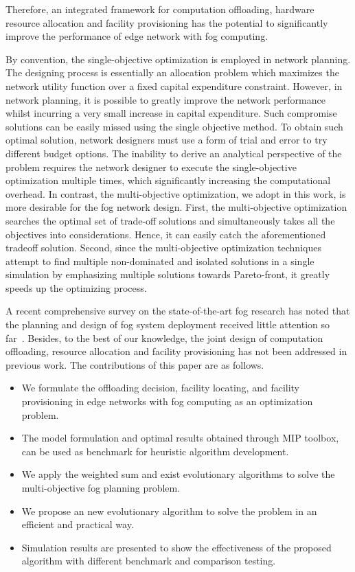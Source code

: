 \documentclass[10pt,journal,compsoc]{IEEEtran}
\begin{document}
Therefore, an integrated framework for computation offloading, hardware resource allocation and facility provisioning has the potential to significantly improve the performance of edge network with fog computing.

By convention, the single-objective optimization is employed in network planning. The designing process is essentially an allocation problem which maximizes the network utility function over a fixed capital expenditure constraint. 
However, in network planning, it is possible to greatly improve the network performance whilst incurring a very small increase in capital expenditure. Such compromise solutions can be easily missed using the single objective method. To obtain such optimal solution, network designers must use a form of trial and error to try different budget options. The inability to derive an analytical perspective of the problem requires the network designer to execute the single-objective optimization multiple times, which significantly increasing the computational overhead. 
In contrast, the multi-objective optimization, we adopt in this work, is more desirable for the fog network design. First, the multi-objective optimization searches the optimal set of trade-off solutions and simultaneously takes all the objectives into considerations. Hence, it can easily catch the aforementioned tradeoff solution.
Second, since the multi-objective optimization techniques attempt to find multiple non-dominated and isolated solutions in a single simulation by emphasizing multiple solutions towards Pareto-front, it greatly speeds up the optimizing process. 





A recent comprehensive survey on the state-of-the-art fog research has noted that the planning and design of fog system deployment received little attention so far~\cite{mouradian2017comprehensive}. Besides, to the best of our knowledge, the joint design of computation offloading, resource allocation and facility provisioning has not been addressed in previous work. The contributions of this paper are as follows.
\begin{itemize}
\item We formulate the offloading decision, facility locating, and facility provisioning in edge networks with fog computing as an optimization problem.
\item The model formulation and optimal results obtained through MIP toolbox, can be used as benchmark for heuristic algorithm development.
\item We apply the weighted sum and exist evolutionary algorithms to solve  the multi-objective fog planning problem.
\item We propose an new evolutionary algorithm to solve the problem in an efficient and practical way.
\item Simulation results are presented to show the effectiveness of the proposed algorithm with different benchmark and comparison testing.
\end{itemize}
\end{document}
